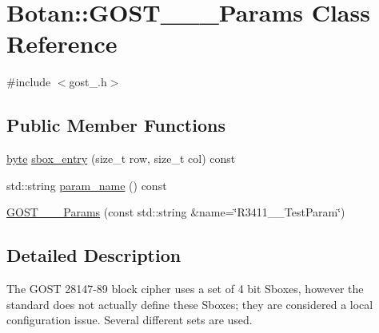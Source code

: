 \hypertarget{classBotan_1_1GOST__28147__89__Params}{\section{Botan\-:\-:G\-O\-S\-T\-\_\-\_\-\_\-\-Params Class Reference}
\label{classBotan_1_1GOST__28147__89__Params}
}


{\ttfamily \#include $<$gost\-\_.\-h$>$}

\subsection*{Public Member Functions}
\begin{DoxyCompactItemize}
\item 
\hyperlink{namespaceBotan_a7d793989d801281df48c6b19616b8b84}{byte} \hyperlink{classBotan_1_1GOST__28147__89__Params_a1be4918d339db9a36b4fd35e2bf13e37}{sbox\-\_\-entry} (size\-\_\-t row, size\-\_\-t col) const 
\item 
std\-::string \hyperlink{classBotan_1_1GOST__28147__89__Params_a90fff92bebba6dd83c407e603d7a62ea}{param\-\_\-name} () const 
\item 
\hyperlink{classBotan_1_1GOST__28147__89__Params_a48e9862b94e2a72caf1d0d6784599229}{G\-O\-S\-T\-\_\-\_\-\_\-\-Params} (const std\-::string \&name=\char`\"{}R3411\-\_\-\_\-\-Test\-Param\char`\"{})
\end{DoxyCompactItemize}


\subsection{Detailed Description}
The G\-O\-S\-T 28147-\/89 block cipher uses a set of 4 bit Sboxes, however the standard does not actually define these Sboxes; they are considered a local configuration issue. Several different sets are used. 

